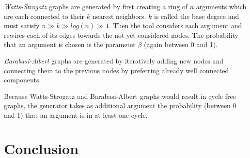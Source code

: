 \documentclass[parskip=half]{scrartcl}
\begin{document}
\emph{Watts-Strogatz} graphs are generated by first creating a ring of $n$
arguments which are each connected to their $k$ nearest neighbors. $k$ is called
the base degree and must satisfy $n \gg k \gg log(n) \gg 1$. Then the tool
considers each argument and rewires each of its edges towards the not yet
considered nodes. The probability that an argument is chosen is the parameter
$\beta$ (again between 0 and 1).

\emph{Barabasi-Albert} graphs are generated by iteratively adding new nodes and
connecting them to the previous nodes by preferring already well connected
components.

Because Watts-Strogatz and Barabasi-Albert graphs would result in cycle free
graphs, the generator takes as additional argument the probability (between 0
and 1) that an argument is in at least one cycle.


\section{Conclusion}
\label{conclusion}

\printbibliography
\end{document}
